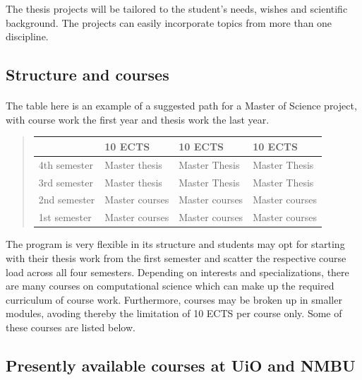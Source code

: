 \documentclass[%
oneside,                 %
final,                   %
10pt]{article}
\begin{document}
\noindent
The thesis projects will be tailored to the student's needs, wishes and scientific background. The projects can easily incorporate topics from more than one discipline.



\subsection{Structure and courses}

\paragraph{}
The table here is an example of a suggested path for a Master of Science project,
with course work the first year and thesis work the last year.


\begin{quote}
\begin{tabular}{llll}
\hline
\multicolumn{1}{l}{  } & \multicolumn{1}{l}{ 10 ECTS } & \multicolumn{1}{l}{ 10 ECTS } & \multicolumn{1}{l}{ 10 ECTS } \\
\hline
4th semester & Master thesis  & Master Thesis  & Master Thesis  \\
\hline
3rd semester & Master thesis  & Master Thesis  & Master Thesis  \\
\hline
2nd semester & Master courses & Master courses & Master courses \\
\hline
1st semester & Master courses & Master courses & Master courses \\
\hline
\end{tabular}
\end{quote}

\noindent
The program is very flexible in its structure and students may opt for starting with their thesis
work from the first semester and scatter the respective course load across all four semesters.
Depending on interests and specializations, there are many courses on computational science which can make
up the required curriculum of course work. Furthermore, courses may be broken up in smaller modules,
avoding thereby the limitation of 10 ECTS per course only. Some of these courses are listed below.



\subsection{Presently available courses at UiO and NMBU}
\end{document}
